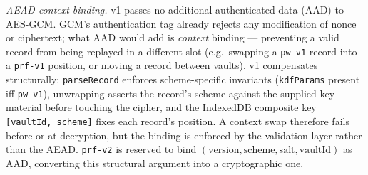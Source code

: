 \documentclass[runningheads]{llncs}
\begin{document}
\emph{AEAD context binding.}
v1 passes no additional authenticated data (AAD) to AES-GCM.
GCM's authentication tag already rejects any modification of nonce or ciphertext; what AAD would add is \emph{context} binding --- preventing a valid record from being replayed in a different slot (e.g.\ swapping a \texttt{pw-v1} record into a \texttt{prf-v1} position, or moving a record between vaults).
v1 compensates structurally: \texttt{parseRecord} enforces scheme-specific invariants (\texttt{kdfParams} present iff \texttt{pw-v1}), unwrapping asserts the record's scheme against the supplied key material before touching the cipher, and the IndexedDB composite key \texttt{[vaultId, scheme]} fixes each record's position.
A context swap therefore fails before or at decryption, but the binding is enforced by the validation layer rather than the AEAD.
\texttt{prf-v2} is reserved to bind $(\mathrm{version}, \mathrm{scheme}, \mathrm{salt}, \mathrm{vaultId})$ as AAD, converting this structural argument into a cryptographic one.
\end{document}
